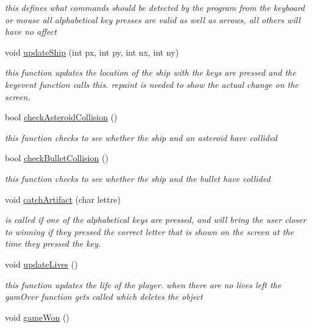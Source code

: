 \begin{DoxyCompactItemize}
\begin{DoxyCompactList}\small\item\em this defines what commands should be detected by the program from the keyboard or mouse all alphabetical key presses are valid as well as arrows, all others will have no affect \end{DoxyCompactList}\item 
void \hyperlink{class_board_ab4edba581d2186597ffbc4840dce43a9}{update\+Ship} (int px, int py, int nx, int ny)
\begin{DoxyCompactList}\small\item\em this function updates the location of the ship with the keys are pressed and the keyevent function calls this. repaint is needed to show the actual change on the screen. \end{DoxyCompactList}\item 
bool \hyperlink{class_board_af53099c24648a602441d60e3259de6e5}{check\+Asteroid\+Collision} ()
\begin{DoxyCompactList}\small\item\em this function checks to see whether the ship and an asteroid have collided \end{DoxyCompactList}\item 
bool \hyperlink{class_board_a8b5a117638f0bbd5f8e258dbf077568a}{check\+Bullet\+Collision} ()
\begin{DoxyCompactList}\small\item\em this function checks to see whether the ship and the bullet have collided \end{DoxyCompactList}\item 
void \hyperlink{class_board_a57e9303a6198a6d5172625ffdcd44865}{catch\+Artifact} (char lettre)
\begin{DoxyCompactList}\small\item\em is called if one of the alphabetical keys are pressed, and will bring the user closer to winning if they pressed the correct letter that is shown on the screen at the time they pressed the key. \end{DoxyCompactList}\item 
void \hyperlink{class_board_a2132dc670c5193b0f935aeed4a4dac4e}{update\+Lives} ()
\begin{DoxyCompactList}\small\item\em this function updates the life of the player. when there are no lives left the gam\+Over function gets called which deletes the object \end{DoxyCompactList}\item 
\hypertarget{class_board_a68b2d6b83b977e033130b50deff4ac3b}{}void \hyperlink{class_board_a68b2d6b83b977e033130b50deff4ac3b}{game\+Won} ()\label{class_board_a68b2d6b83b977e033130b50deff4ac3b}


\end{DoxyCompactItemize}
